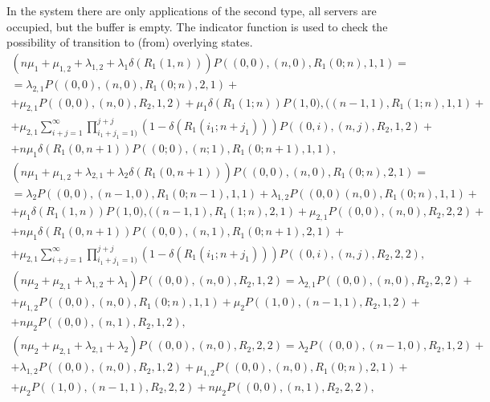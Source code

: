 \documentclass[default]{subfiles}
\begin{document}
{In the system there are only applications of the second type, all
servers are occupied, but the buffer is empty. The indicator function
is used to check the possibility of transition to (from) overlying
states.
\begin{multline}
  \left(n\mu_1+\mu_{1,2}+\lambda_{1,2}+\lambda_1 \delta\left(R_1
      (1,n)\right)\right) P\left((0,0),(n,0),R_1 (0;n),1,1\right) = \\
  = \lambda_{2,1} P\left((0,0),(n,0),R_1 (0;n),2,1\right)+ \\ +
  \mu_{2,1} P\left((0,0),(n,0),R_2,1,2\right)+\mu_1 \delta\left(R_1
    (1;n)\right) P\left(1,0),((n-1,1),R_1 (1;n),1,1\right)+\\ +
  \mu_{2,1}
  \sum\limits_{i+j=1}^{\infty}\prod\limits_{i_1+j_1=1)}^{j+j}\left(1-\delta\left(R_1
      (i_1;n+j_1) \right)\right) P\left((0,i),(n,j),R_2,1,2\right)+ \\
  + n\mu_1 \delta\left(R_1 (0,n+1)\right) P\left((0;0),(n;1),R_1
    (0;n+1),1,1\right),
\label{eq:6.1}
\end{multline}
\begin{multline}
  \left(n\mu_1+\mu_{1,2}+\lambda_{2,1}+\lambda_2 \delta\left(R_1
      (0,n+1)\right)\right) P\left((0,0),(n,0),R_1 (0;n),2,1\right) =
  \\ = \lambda_2 P\left((0,0),(n-1,0),R_1 (0;n-1),1,1\right)+
  \lambda_{1,2} P\left((0,0)(n,0),R_1 (0;n),1,1\right)+ \\ + \mu_1
  \delta\left(R_1 (1,n)\right) P\left(1,0),((n-1,1),R_1
    (1;n),2,1\right)+\mu_{2,1} P\left((0,0),(n,0),R_2,2,2\right)+\\ +
  n\mu_1 \delta\left(R_1 (0,n+1)\right) P\left((0,0),(n,1), R_1
    (0;n+1),2,1\right)+ \\ + \mu_{2,1}
  \sum\limits_{i+j=1}^{\infty}\prod\limits_{i_1+j_1=1)}^{j+j}\left(1-\delta\left(R_1
      (i_1;n+j_1) \right)\right) P\left((0,i),(n,j),R_2,2,2\right),
\label{eq:6.2}
\end{multline}
\begin{multline}
  \left(n\mu_2+\mu_{2,1}+\lambda_{1,2}+\lambda_1 \right)
  P\left((0,0),(n,0),R_2,1,2\right) = \lambda_{2,1}
  P\left((0,0),(n,0),R_2,2,2\right)+ \\ +
  \mu_{1,2} P\left((0,0),(n,0), R_1(0;n),1,1\right)+ \mu_2
  P\left((1,0),(n-1,1),R_2,1,2\right)+ \\ +
  n\mu_2 P\left((0,0),(n,1), R_2,1,2\right),
\label{eq:6.3}
\end{multline}
\begin{multline}
  \left(n\mu_2+\mu_{2,1}+\lambda_{2,1}+\lambda_2\right)
  P\left((0,0),(n,0),R_2,2,2\right) = \lambda_2
  P\left((0,0),(n-1,0),R_2,1,2\right)+\\ + \lambda_{1,2}
  P\left((0,0),(n,0),R_2,1,2\right)+ \mu_{1,2}
  P\left((0,0),(n,0),R_1(0;n),2,1\right)+\\ + \mu_2
  P\left((1,0),(n-1,1),R_2,2,2\right)+ n\mu_2 P\left((0,0),(n,1),
    R_2,2,2\right),
\label{eq:6.4}
\end{multline}

}
\end{document}
